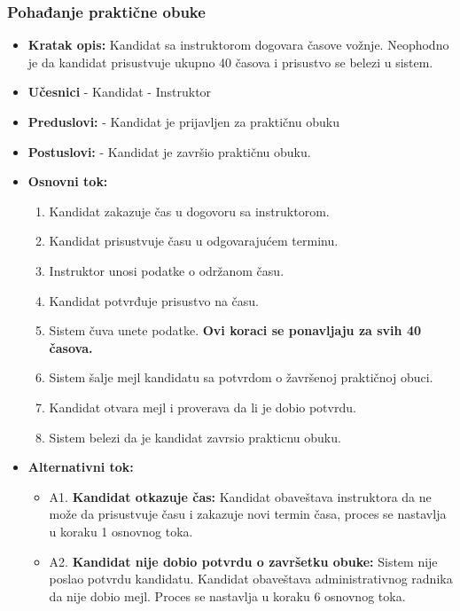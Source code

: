 \subsubsection{Pohađanje praktične obuke}

\vspace{3mm}

\begin{itemize}

\item \textbf{Kratak opis:} Kandidat sa instruktorom dogovara časove vožnje. Neophodno je da kandidat prisustvuje ukupno 40 časova i prisustvo se belezi u sistem.

\vspace{2mm}

\item \textbf{Učesnici} \newline
   - Kandidat \newline   
   - Instruktor 
   
\item \textbf{Preduslovi:} \newline
   - Kandidat je prijavljen za praktičnu obuku 

\item \textbf{Postuslovi:} \newline
    - Kandidat je završio praktičnu obuku.

\item \textbf{Osnovni tok:}  
   \begin{enumerate}
   \item Kandidat zakazuje čas u dogovoru sa instruktorom.
   \item Kandidat prisustvuje času u odgovarajućem terminu.
   \item Instruktor unosi podatke o održanom času.
   \item Kandidat potvrđuje prisustvo na času.
   \item Sistem čuva unete podatke. \newline
\textbf{Ovi koraci se ponavljaju za svih 40 časova.}
   \item Sistem šalje mejl kandidatu sa potvrdom o žavršenoj praktičnoj obuci.
   \item Kandidat otvara mejl i proverava da li je dobio potvrdu. 
   \item Sistem belezi da je kandidat zavrsio prakticnu obuku.
   \end{enumerate}

\item \textbf{Alternativni tok:}  
   \begin{itemize}
   \item A1. \textbf{Kandidat otkazuje čas:}
  Kandidat obaveštava instruktora da ne može da prisustvuje času i zakazuje novi termin časa, proces se nastavlja u koraku 1 osnovnog toka.
  \item A2. \textbf{Kandidat nije dobio potvrdu o završetku obuke:}
  Sistem nije poslao potvrdu kandidatu. Kandidat obaveštava administrativnog radnika da nije dobio mejl. Proces se nastavlja u koraku 6 osnovnog toka.
   \end{itemize}

\end{itemize}
